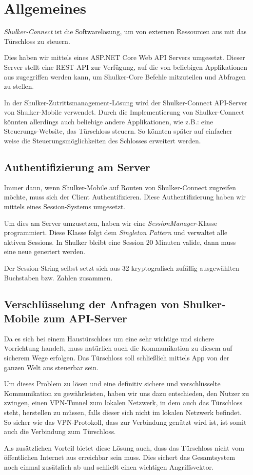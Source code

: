 \lstset{language=[Sharp]C}
\chapter{Allgemeines}
\textit{Shulker-Connect} ist die Softwarelösung, um von externen Ressourcen aus mit das Türschloss zu steuern.

Dies haben wir mittels eines ASP.NET Core Web API Servers umgesetzt. Dieser Server stellt eine REST-API zur Verfügung, 
auf die von beliebigen Applikationen aus zugegriffen werden kann, um Shulker-Core Befehle mitzuteilen und Abfragen zu stellen.

In der Shulker-Zutrittsmanagement-Lösung wird der Shulker-Connect API-Server von Shulker-Mobile verwendet. 
Durch die Implementierung von Shulker-Connect könnten allerdings auch beliebige andere Applikationen, 
wie z.B.: eine Steuerungs-Website, das Türschloss steuern. 
So könnten später auf einfacher weise die Steuerungsmöglichkeiten des Schlosses erweitert werden.

\section{Authentifizierung am Server}
Immer dann, wenn Shulker-Mobile auf Routen von Shulker-Connect zugreifen möchte, muss sich der Client Authentifizieren.
Diese Authentifizierung haben wir mittels eines Session-Systems umgesetzt.

Um dies am Server umzusetzen, haben wir eine \textit{SessionManager}-Klasse programmiert. Diese Klasse folgt dem
\textit{Singleton Pattern} und verwaltet alle aktiven Sessions. In Shulker bleibt eine Session 20 Minuten valide, dann
muss eine neue generiert werden.

Der Session-String selbst setzt sich aus 32 kryptografisch zufällig ausgewählten Buchstaben bzw. Zahlen zusammen.

\section{Verschlüsselung der Anfragen von Shulker-Mobile zum API-Server}
Da es sich bei einem Haustürschloss um eine sehr wichtige und sichere Vorrichtung handelt, muss natürlich auch die
Kommunikation zu diesem auf sicherem Wege erfolgen. Das Türschloss soll schließlich mittels App von der ganzen Welt
aus steuerbar sein.

Um dieses Problem zu lösen und eine definitiv sichere und verschlüsselte Kommunikation zu gewährleisten, haben wir uns dazu 
entschieden, den Nutzer zu zwingen, einen VPN-Tunnel zum lokalen Netzwerk, in dem auch das Türschloss steht, herstellen
zu müssen, falls dieser sich nicht im lokalen Netzwerk befindet. So sicher wie das VPN-Protokoll, dass zur Verbindung genützt
wird ist, ist somit auch die Verbindung zum Türschloss.

Als zusätzlichen Vorteil bietet diese Lösung auch, dass das Türschloss nicht vom öffentlichen Internet aus erreichbar sein muss.
Dies sichert das Gesamtsystem noch einmal zusätzlich ab und schließt einen wichtigen Angriffsvektor.